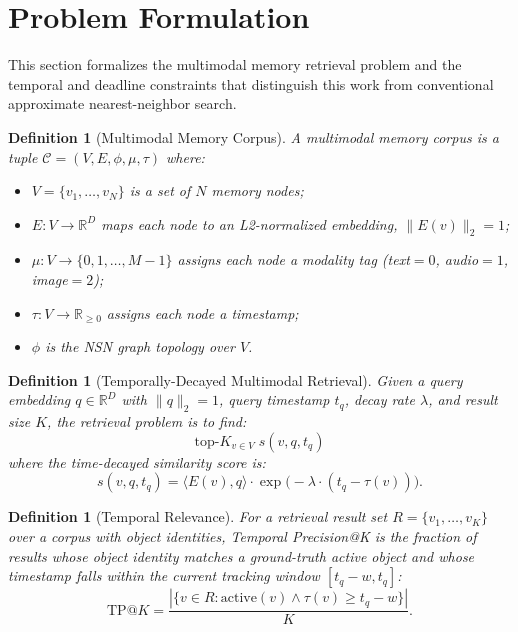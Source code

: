 \documentclass[11pt]{article}
\newtheorem{definition}[theorem]{Definition}
\begin{document}
\section{Problem Formulation}
\label{sec:formulation}

This section formalizes the multimodal memory retrieval problem and the
temporal and deadline constraints that distinguish this work from
conventional approximate nearest-neighbor search.

\begin{definition}[Multimodal Memory Corpus]
\label{def:corpus}
A multimodal memory corpus is a tuple
$\mathcal{C} = (V, E, \phi, \mu, \tau)$ where:
\begin{itemize}
\item $V = \{v_1, \ldots, v_N\}$ is a set of $N$ memory nodes;
\item $E: V \rightarrow \mathbb{R}^D$ maps each node to an
  L2-normalized embedding, $\|E(v)\|_2 = 1$;
\item $\mu: V \rightarrow \{0, 1, \ldots, M-1\}$ assigns each node a
  modality tag (text${=}0$, audio${=}1$, image${=}2$);
\item $\tau: V \rightarrow \mathbb{R}_{\geq 0}$ assigns each node a
  timestamp;
\item $\phi$ is the NSN graph topology over $V$.
\end{itemize}
\end{definition}

\begin{definition}[Temporally-Decayed Multimodal Retrieval]
\label{def:retrieval}
Given a query embedding $q \in \mathbb{R}^D$ with $\|q\|_2 = 1$, query
timestamp $t_q$, decay rate $\lambda$, and result size $K$, the
retrieval problem is to find:
\[
\mathrm{top}\text{-}K_{v \in V} \; s(v, q, t_q)
\]
where the time-decayed similarity score is:
\[
s(v, q, t_q) = \langle E(v), q \rangle \cdot
  \exp\!\bigl(-\lambda \cdot (t_q - \tau(v))\bigr).
\]
\end{definition}

\begin{definition}[Temporal Relevance]
\label{def:temporal_relevance}
For a retrieval result set $R = \{v_1, \ldots, v_K\}$ over a corpus
with object identities, \emph{Temporal Precision@K} is the fraction of
results whose object identity matches a ground-truth active object
\emph{and} whose timestamp falls within the current tracking window
$[t_q - w, t_q]$:
\[
\mathrm{TP@}K = \frac{|\{v \in R : \mathrm{active}(v) \wedge
  \tau(v) \geq t_q - w\}|}{K}.
\]
\end{definition}
\end{document}
